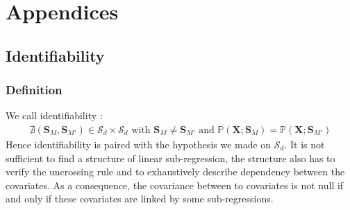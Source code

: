 \documentclass[12pt,a4paper]{report}
\begin{document}

%

%		
%		
%		
%		
%		
%			
\chapter{Appendices}

	\section{Identifiability}
		\subsection{Definition}
		We call identifiability :
\begin{eqnarray}
	\nexists (\boldsymbol{S}_M,\boldsymbol{S}_{M'}) \in \mathcal{S}_d\times \mathcal{S}_d \textrm{ with } \boldsymbol{S}_M \neq \boldsymbol{S}_{M'} \textrm{ and }
	\mathbb{P}(\boldsymbol{X};\boldsymbol{S}_{M})=\mathbb{P}(\boldsymbol{X};\boldsymbol{S}_{M'})
 \end{eqnarray}
	Hence identifiability is paired with the hypothesis we made on $ \mathcal{S}_d$. It is not sufficient to find a structure of linear sub-regression, the structure also has to verify the uncrossing rule and to exhaustively describe dependency between the covariates. As a consequence, the covariance between to covariates is not null if and only if these covariates are linked by some sub-regressions.
 
\end{document}
